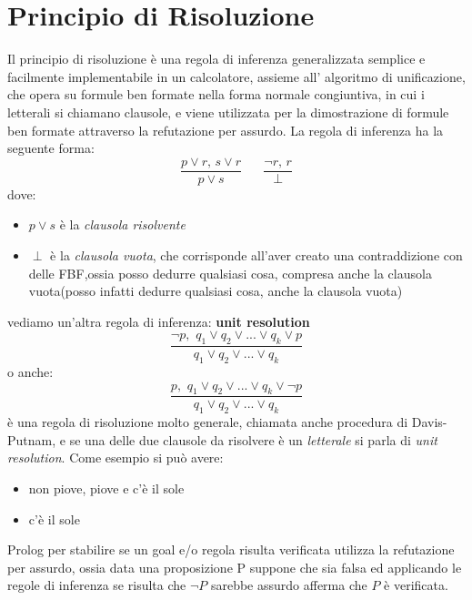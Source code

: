 \documentclass[a4paper]{report}
\begin{document}
\section{Principio di Risoluzione}
Il principio di risoluzione è una regola di inferenza generalizzata semplice e facilmente implementabile in un calcolatore, assieme all'
algoritmo di unificazione, che opera su formule ben formate nella forma normale congiuntiva, in cui i letterali si chiamano clausole,
e viene utilizzata per la dimostrazione di formule ben formate attraverso la refutazione per assurdo.
La regola di inferenza ha la seguente forma:
\begin{equation*}
  \frac{p\vee r,\, s\lor r}{p\vee s}\,\,\,\,\,\,\,\,\,\,\frac{\neg r,\, r}{\perp}
\end{equation*}
dove:
\begin{itemize}
\item $p \lor  s$ è la \textit{clausola risolvente}
\item $\perp$ è la \textit{clausola vuota}, che corrisponde all'aver creato una contraddizione con delle FBF,ossia posso dedurre qualsiasi cosa,
       compresa anche la clausola vuota(posso infatti dedurre qualsiasi cosa, anche la clausola vuota)
\end{itemize}
vediamo un'altra regola di inferenza:
\textbf{unit resolution}
   \begin{equation*}
     \frac{\neg p,\,\, q_1\vee q_2\vee ... \vee q_k \vee p}{q_1\vee q_2\vee ... \vee q_k}
   \end{equation*}
o anche:
\begin{equation*}
  \frac{p,\,\, q_1\vee q_2\vee ... \vee q_k \vee \neg p}{q_1\vee q_2\vee ... \vee q_k}
\end{equation*}
è una regola di risoluzione molto generale, chiamata anche procedura di Davis-Putnam, e se una delle due clausole da risolvere
è un \textit{letterale} si parla di \emph{unit resolution}.\newline
Come esempio si può avere:
\begin{itemize}
\item non piove, piove e c'è il sole
\item c'è il sole
\end{itemize}

Prolog per stabilire se un goal e/o regola risulta verificata utilizza la refutazione per assurdo, ossia data una proposizione P suppone che
sia falsa ed applicando le regole di inferenza se risulta che $\neg P$ sarebbe assurdo afferma che $P$ è verificata.
\end{document}
